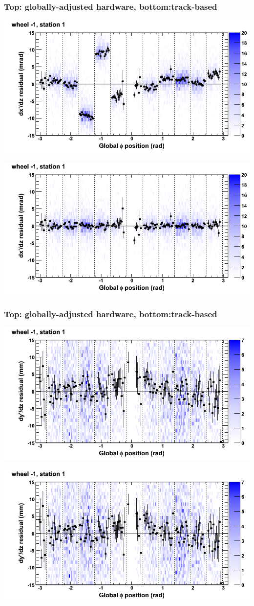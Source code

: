 \documentclass[compress]{beamer}
\begin{document}
\begin{frame}
\frametitle{Top: globally-adjusted hardware, bottom:track-based}
\includegraphics[width=0.7\linewidth]{NOV4_mapplots_HW/DTvsphi_st1whB_dxdz.png}

\includegraphics[width=0.7\linewidth]{NOV4_mapplots/DTvsphi_st1whB_dxdz.png}
\end{frame}

\begin{frame}
\frametitle{Top: globally-adjusted hardware, bottom:track-based}
\includegraphics[width=0.7\linewidth]{NOV4_mapplots_HW/DTvsphi_st1whB_dydz.png}

\includegraphics[width=0.7\linewidth]{NOV4_mapplots/DTvsphi_st1whB_dydz.png}
\end{frame}
\end{document}
